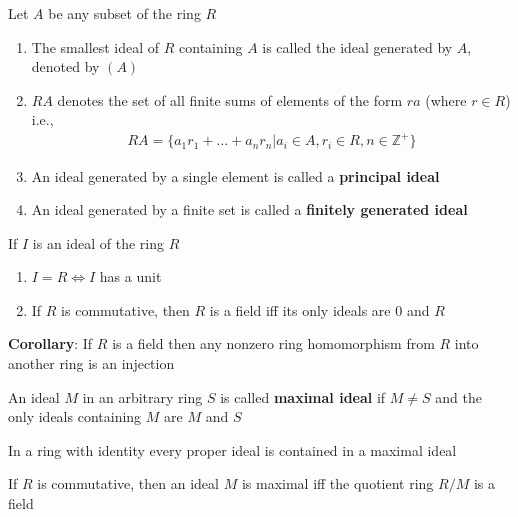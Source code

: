 \documentclass[titlepage, 12pt]{article}
\begin{document}
\begin{definition}{}{}
    Let $A$ be any subset of the ring $R$
    \begin{enumerate}
        \item The smallest ideal of $R$ containing $A$ is called the ideal
            generated by $A$, denoted by $(A)$
        \item $RA$ denotes the set of all finite sums of elements of the form
            $ra$ (where $r\in R$) i.e.,
            \begin{gather*}
                RA = \{a_1r_1+\dots+a_nr_n | a_i\in A, r_i\in R,
                n\in\mathbb{Z}^+\}
            \end{gather*}
        \item An ideal generated by a single element is called a
            \textbf{principal ideal}
        \item An ideal generated by a finite set is called a \textbf{finitely
            generated ideal}
    \end{enumerate}
\end{definition}

\begin{proposition}{}{}
    If $I$ is an ideal of the ring $R$
    \begin{enumerate}
        \item $I = R\iff I$ has a unit
        \item If $R$ is commutative, then $R$ is a field iff its only ideals are
            $0$ and $R$
    \end{enumerate}
\end{proposition}

\textbf{Corollary}: If $R$ is a field then any nonzero ring homomorphism from
$R$ into another ring is an injection

\begin{definition}{}{}
    An ideal $M$ in an arbitrary ring $S$ is called \textbf{maximal ideal} if
    $M\neq S$ and the only ideals containing $M$ are $M$ and $S$
\end{definition}

\begin{proposition}{}{}
    In a ring with identity every proper ideal is contained in a maximal ideal
\end{proposition}

\begin{proposition}{}{}
    If $R$ is commutative, then an ideal $M$ is maximal iff the quotient ring
    $R/M$ is a field
\end{proposition}
\end{document}
